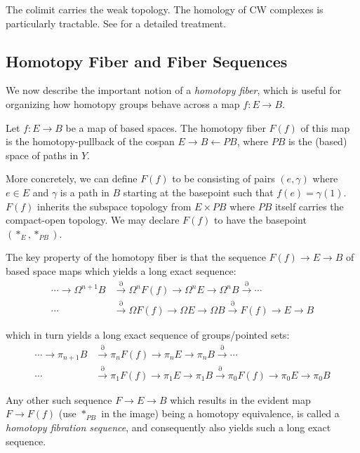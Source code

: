 The colimit carries the weak topology.
The homology of CW complexes is particularly tractable. See \cite{Hatcher} for a detailed treatment.


\subsection{Homotopy Fiber and Fiber Sequences}

We now describe the important notion of a \emph{homotopy fiber}, which is useful for organizing how homotopy groups behave across a map $f : E \to B$.

\begin{definition}
Let $f : E \to B$ be a map of based spaces. The homotopy fiber $F(f)$ of this map is the homotopy-pullback of the cospan $E \to B \leftarrow PB$,
where $PB$ is the (based) space of paths in $Y$.
\end{definition}
More concretely, we can define $F(f)$ to be consisting of pairs $(e,\gamma)$ where $e \in E$ and $\gamma$ is a path in $B$ starting at the basepoint such that 
$f(e) = \gamma(1)$. $F(f)$ inherits the subspace topology from $E \times PB$ where $PB$ itself carries the compact-open topology. We may declare $F(f)$ to have the basepoint $(*_E,*_{PB})$.

The key property of the homotopy fiber is that the sequence $F(f) \to E \to B$ of based space maps which yields a long exact sequence:
\begin{align*}
  \cdots \to \Omega^{n+1} B &\xrightarrow{\partial} \Omega^n F(f) \to \Omega^n E \to \Omega^n B \xrightarrow{\partial} \cdots \\
  \cdots &\xrightarrow{\partial}  \Omega F(f) \to \Omega E \to \Omega B \xrightarrow{\partial} F(f) \to E \to B
\end{align*}

which in turn yields a long exact sequence of groups/pointed sets:
\begin{align*}
  \cdots \to \pi_{n+1} B &\xrightarrow{\partial} \pi_n F(f) \to \pi_n E \to \pi_n B \xrightarrow{\partial} \cdots \\
  \cdots &\xrightarrow{\partial} \pi_1 F(f) \to \pi_1 E \to \pi_1 B \xrightarrow{\partial} \pi_0 F(f) \to \pi_0 E \to \pi_0 B
\end{align*}

Any other such sequence $F \to E \to B$ which results in the evident map $F \to F(f)$ (use $*_{PB}$ in the image) being a homotopy equivalence,
is called a \emph{homotopy fibration sequence}, and consequently also yields such a long exact sequence.

